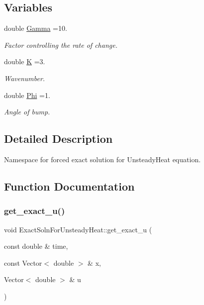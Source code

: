 \subsection*{Variables}
\begin{DoxyCompactItemize}
\item 
double \hyperlink{namespaceExactSolnForUnsteadyHeat_a188d3472da738e31efb23740c027754c}{Gamma} =10.
\begin{DoxyCompactList}\small\item\em Factor controlling the rate of change. \end{DoxyCompactList}\item 
double \hyperlink{namespaceExactSolnForUnsteadyHeat_a20d04bcf14546becd4bcdf45446be756}{K} =3.
\begin{DoxyCompactList}\small\item\em Wavenumber. \end{DoxyCompactList}\item 
double \hyperlink{namespaceExactSolnForUnsteadyHeat_a630f9e8d892cfcc41cdaef25bfc87ca1}{Phi} =1.
\begin{DoxyCompactList}\small\item\em Angle of bump. \end{DoxyCompactList}\end{DoxyCompactItemize}


\subsection{Detailed Description}
Namespace for forced exact solution for Unsteady\+Heat equation. 

\subsection{Function Documentation}
\mbox{\label{namespaceExactSolnForUnsteadyHeat_a1d5b22857bd2a7825397daf1cf9c89eb}} 
\subsubsection{\texorpdfstring{get\+\_\+exact\+\_\+u()}{get\_exact\_u()}\hspace{0.1cm}{\footnotesize\ttfamily [1/2]}}
{\footnotesize\ttfamily void Exact\+Soln\+For\+Unsteady\+Heat\+::get\+\_\+exact\+\_\+u (\begin{DoxyParamCaption}\item[{const double \&}]{time,  }\item[{const Vector$<$ double $>$ \&}]{x,  }\item[{Vector$<$ double $>$ \&}]{u }\end{DoxyParamCaption})}



